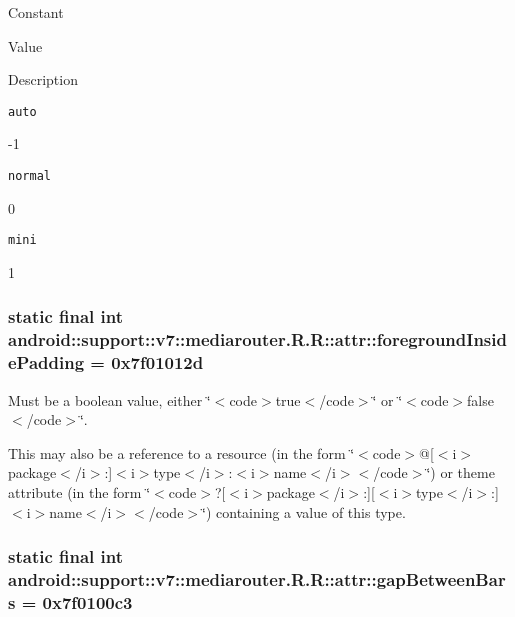 Constant

Value

Description 

{\tt auto}

-1

{\tt normal}

0

{\tt mini}

1\hypertarget{classandroid_1_1support_1_1v7_1_1mediarouter_1_1_r_1_1attr_25411aea7b1b4395bfd5fd311e3de7f3}{
\subsubsection[{foregroundInsidePadding}]{\setlength{\rightskip}{0pt plus 5cm}static final int android::support::v7::mediarouter.R.R::attr::foregroundInsidePadding = 0x7f01012d}}
\label{classandroid_1_1support_1_1v7_1_1mediarouter_1_1_r_1_1attr_25411aea7b1b4395bfd5fd311e3de7f3}


Must be a boolean value, either \char`\"{}$<$code$>$true$<$/code$>$\char`\"{} or \char`\"{}$<$code$>$false$<$/code$>$\char`\"{}. 

This may also be a reference to a resource (in the form \char`\"{}$<$code$>$@\mbox{[}$<$i$>$package$<$/i$>$:\mbox{]}$<$i$>$type$<$/i$>$:$<$i$>$name$<$/i$>$$<$/code$>$\char`\"{}) or theme attribute (in the form \char`\"{}$<$code$>$?\mbox{[}$<$i$>$package$<$/i$>$:\mbox{]}\mbox{[}$<$i$>$type$<$/i$>$:\mbox{]}$<$i$>$name$<$/i$>$$<$/code$>$\char`\"{}) containing a value of this type. \hypertarget{classandroid_1_1support_1_1v7_1_1mediarouter_1_1_r_1_1attr_b98ec1c5b880dc5bfed9524b20a55cc2}{
\subsubsection[{gapBetweenBars}]{\setlength{\rightskip}{0pt plus 5cm}static final int android::support::v7::mediarouter.R.R::attr::gapBetweenBars = 0x7f0100c3}}
\label{classandroid_1_1support_1_1v7_1_1mediarouter_1_1_r_1_1attr_b98ec1c5b880dc5bfed9524b20a55cc2}


